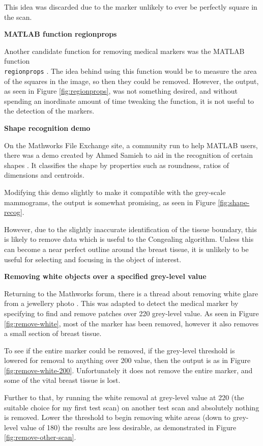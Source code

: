 This idea was discarded due to the marker unlikely to ever be perfectly square in the scan.

\noindent \textbf{MATLAB function regionprops}

Another candidate function for removing medical markers was the MATLAB function \\ \texttt{regionprops} \cite{regionprops}. The idea behind using this function would be to measure the area of the squares in the image, so then they could be removed. However, the output, as seen in Figure \ref{fig:regionprops}, was not something desired, and without spending an inordinate amount of time tweaking the function, it is not useful to the detection of the markers.

\noindent \textbf{Shape recognition demo}

On the Mathworks File Exchange site, a community run to help MATLAB users, there was a demo created by Ahmed Samieh to aid in the recognition of certain shapes \cite{shape_recognition}. It classifies the shape by properties such as roundness, ratios of dimensions and centroids.

Modifying this demo slightly to make it compatible with the grey-scale mammograms, the output is somewhat promising, as seen in Figure \ref{fig:shape-recog}.

However, due to the slightly inaccurate identification of the tissue boundary, this is likely to remove data which is useful to the \Gls{Congealing} algorithm. Unless this can become a near perfect outline around the breast tissue, it is unlikely to be useful for selecting and focusing in the object of interest.

\noindent  \textbf{Removing white objects over a specified grey-level value}

Returning to the Mathworks forum, there is a thread about removing white glare from a jewellery photo \cite{remove_white}. This was adapted to detect the medical marker by specifying to find and remove patches over 220 grey-level value. As seen in Figure \ref{fig:remove-white}, most of the marker has been removed, however it also removes a small section of breast tissue.

To see if the entire marker could be removed, if the grey-level threshold is lowered for removal to anything over 200 value, then the output is as in Figure \ref{fig:remove-white-200}. Unfortunately it does not remove the entire marker, and some of the vital breast tissue is lost.

Further to that, by running the white removal at grey-level value at 220 (the suitable choice for my first test scan) on another test scan and absolutely nothing is removed. Lower the threshold to begin removing white areas (down to grey-level value of 180) the results are less desirable, as demonstrated in Figure \ref{fig:remove-other-scan}.

